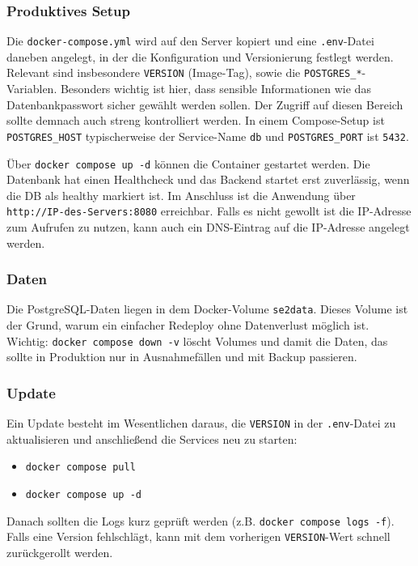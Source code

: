 \documentclass[12pt,a4paper]{article}
\begin{document}
    \subsubsection{Produktives Setup}
        Die \texttt{docker-compose.yml} wird auf den Server kopiert und eine \texttt{.env}-Datei daneben angelegt, in
        der die Konfiguration und Versionierung festlegt werden. Relevant sind insbesondere \texttt{VERSION} (Image-Tag), sowie die
        \texttt{POSTGRES\_*}-Variablen. Besonders wichtig ist hier, dass sensible Informationen wie das Datenbankpasswort sicher gewählt werden sollen.
        Der Zugriff auf diesen Bereich sollte demnach auch streng kontrolliert werden.
        In einem Compose-Setup ist \texttt{POSTGRES\_HOST} typischerweise der Service-Name \texttt{db} und \texttt{POSTGRES\_PORT} ist \texttt{5432}.

        Über \texttt{docker compose up -d} können die Container gestartet werden. Die Datenbank hat einen Healthcheck und das Backend startet erst zuverlässig, wenn die DB als healthy markiert ist.
        Im Anschluss ist die Anwendung über \texttt{http://IP-des-Servers:8080} erreichbar.
        Falls es nicht gewollt ist die IP-Adresse zum Aufrufen zu nutzen, kann auch ein DNS-Eintrag auf die IP-Adresse angelegt werden.

    \subsubsection{Daten}
    Die PostgreSQL-Daten liegen in dem Docker-Volume \texttt{se2data}. Dieses Volume ist der Grund, warum ein einfacher Redeploy ohne Datenverlust möglich ist.
    Wichtig: \texttt{docker compose down -v} löscht Volumes und damit die Daten, das sollte in Produktion nur in Ausnahmefällen und mit Backup passieren.

    \subsubsection{Update}
    Ein Update besteht im Wesentlichen daraus, die \texttt{VERSION} in der \texttt{.env}-Datei zu aktualisieren und anschließend die Services neu zu starten:
    \begin{itemize}[leftmargin=*]
        \item \texttt{docker compose pull}
        \item \texttt{docker compose up -d}
    \end{itemize}
    Danach sollten die Logs kurz geprüft werden (z.B. \texttt{docker compose logs -f}). Falls eine Version fehlschlägt, kann mit dem vorherigen \texttt{VERSION}-Wert schnell zurückgerollt werden.
\end{document}
